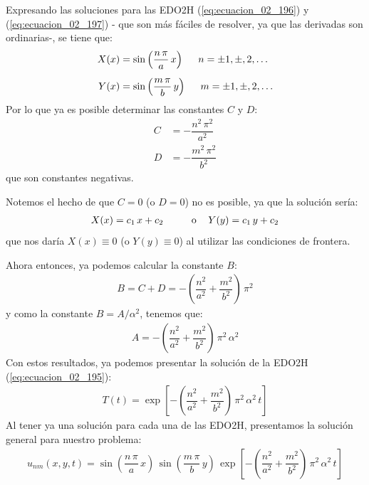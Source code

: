 Expresando las soluciones para las EDO2H (\ref{eq:ecuacion_02_196}) y (\ref{eq:ecuacion_02_197}) - que son más fáciles de resolver, ya que las derivadas son ordinarias-, se tiene que:
\begin{align}
X (x) &= \sin \left( \dfrac{n \, \pi}{a} \, x \right) \hspace{0.5cm} n = \pm 1, \pm, 2, \ldots \label{eq:ecuacion_02_202} \\[0.5em]
Y (x) &= \sin \left( \dfrac{m \, \pi}{b} \, y \right) \hspace{0.5cm} m = \pm 1, \pm, 2, \ldots \label{eq:ecuacion_02_203}
\end{align}
Por lo que ya es posible determinar las constantes $C$ y $D$:
\begin{align*}
C &= - \dfrac{n^{2} \, \pi^{2}}{a^{2}} \\[0.5em]
D &= - \dfrac{m^{2} \, \pi^{2}}{b^{2}}
\end{align*}
que son constantes negativas.
\par
Notemos el hecho de que $C = 0$ (o $D = 0$) no es posible, ya que la solución sería:
\begin{align*}
X (x) = c_{1} \, x + c_{2} \hspace{1cm} \mbox{o } \hspace{0.3cm} Y (y) = c_{1} \, y + c_{2}
\end{align*}
que nos daría $X (x) \equiv 0$ (o $Y (y) \equiv 0$) al utilizar las condiciones de frontera.
\par
Ahora entonces, ya podemos calcular la constante $B$:
\begin{align*}
B = C + D = - \left( \dfrac{n^{2}}{a^{2}} + \dfrac{m^{2}}{b^{2}} \right) \, \pi^{2}
\end{align*}
y como la constante $B = A / \alpha^{2}$, tenemos que:
\begin{align}
A = - \left( \dfrac{n^{2}}{a^{2}} + \dfrac{m^{2}}{b^{2}} \right) \, \pi^{2} \, \alpha^{2}
\label{eq:ecuacion_02_204}
\end{align}
Con estos resultados, ya podemos presentar la solución de la EDO2H (\ref{eq:ecuacion_02_195}):
\begin{align}
T (t) = \exp\left[ - \left( \dfrac{n^{2}}{a^{2}} + \dfrac{m^{2}}{b^{2}} \right) \, \pi^{2} \, \alpha^{2} \, t \right]
\label{eq:ecuacion_02_205}
\end{align}
Al tener ya una solución para cada una de las EDO2H, presentamos la solución general para nuestro problema:
\begin{align}
u_{nm} (x, y, t) = \sin \left( \dfrac{n \, \pi}{a} \, x \right) \, \sin \left( \dfrac{m \, \pi}{b} \, y \right) \, \exp\left[ - \left( \dfrac{n^{2}}{a^{2}} + \dfrac{m^{2}}{b^{2}} \right) \, \pi^{2} \, \alpha^{2} \, t \right]
\label{eq:ecuacion_02_206}
\end{align}
